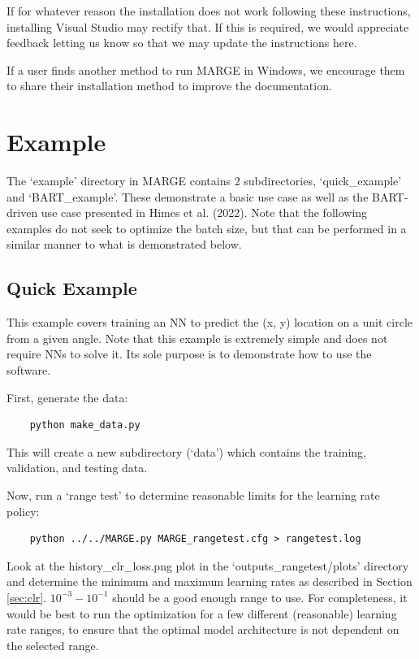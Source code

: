 \documentclass[letterpaper, 12pt]{article}
\begin{document}
\noindent If for whatever reason the installation does not work following these 
instructions, installing Visual Studio may rectify that.  If this is required, 
we would appreciate feedback letting us know so that we may update the 
instructions here. \newline

\noindent If a user finds another method to run MARGE in Windows, 
we encourage them to share their installation method to improve the 
documentation.


\section{Example}
\label{sec:example}

\noindent The `example' directory in MARGE contains 2 subdirectories, 
`quick\_example' and `BART\_example'.  These demonstrate a basic use 
case as well as the BART-driven use case presented in Himes et al. (2022).
Note that the following examples do not seek to optimize the batch size, 
but that can be performed in a similar manner to what is demonstrated below.

\subsection{Quick Example}

\noindent This example covers training an NN to predict the (x, y) location on a 
unit circle from a given angle.  Note that this example is extremely simple and 
does not require NNs to solve it.  Its sole purpose is to demonstrate how to 
use the software.\newline

\noindent First, generate the data:
\begin{verbatim}
	python make_data.py
\end{verbatim}
\noindent This will create a new subdirectory (`data') which contains the 
training, validation, and testing data.\newline

\noindent Now, run a `range test' to determine reasonable limits for 
the learning rate policy:
\begin{verbatim}
	python ../../MARGE.py MARGE_rangetest.cfg > rangetest.log
\end{verbatim}
\noindent Look at the history\_clr\_loss.png plot in the `outputs\_rangetest/plots' 
directory and determine the minimum and maximum learning rates as described in 
Section \ref{sec:clr}.  $10^{-3} - 10^{-1}$ should be a good enough range to use. 
For completeness, it would be best to run the optimization for a few different 
(reasonable) learning rate ranges, to ensure that the optimal model architecture 
is not dependent on the selected range. \newline
\end{document}
